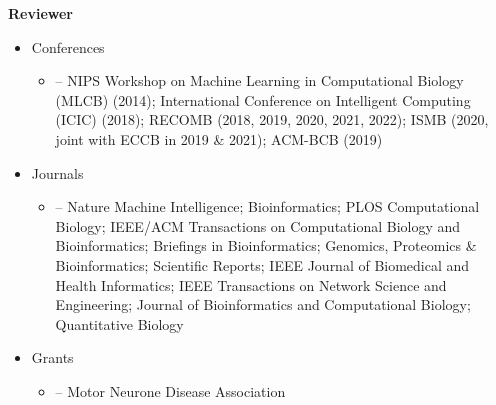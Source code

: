 \documentclass[10pt]{article}
\newenvironment{outerlist}[1][\enskip\textbullet]%
        {\begin{itemize}[#1,leftmargin=*]}{\end{itemize}%
         \vspace{-.6\baselineskip}}
\newenvironment{innerlist}[1][\enskip\textbullet]%
        {\begin{itemize}[#1,leftmargin=*,parsep=0pt,itemsep=0pt,topsep=0pt,partopsep=0pt]}
        {\end{itemize}}
\begin{document}
{\bf Reviewer}
\begin{outerlist}
    \item Conferences
    \begin{innerlist}
    \item[--] NIPS Workshop on Machine Learning in Computational Biology (MLCB) (2014); International Conference on Intelligent Computing (ICIC) (2018); RECOMB (2018, 2019, 2020, 2021, 2022); ISMB (2020, joint with ECCB in 2019 \& 2021); ACM-BCB (2019)
    \end{innerlist}
    \item Journals
    \begin{innerlist}
    \item[--] Nature Machine Intelligence; Bioinformatics; PLOS Computational Biology; IEEE/ACM Transactions on Computational Biology and Bioinformatics; Briefings in Bioinformatics; Genomics, Proteomics \& Bioinformatics; Scientific Reports; IEEE Journal of Biomedical and Health Informatics; IEEE Transactions on Network Science and Engineering; Journal of Bioinformatics and Computational Biology; Quantitative Biology
    \end{innerlist}
    \item Grants
    \begin{innerlist}
    \item[--] Motor Neurone Disease Association
    \end{innerlist}

\end{outerlist}
\end{document}
